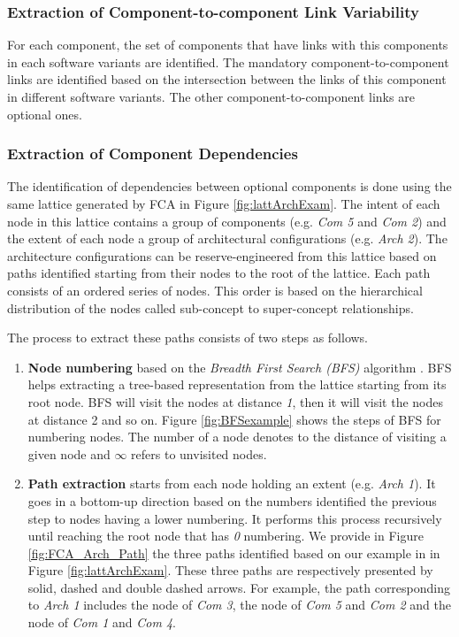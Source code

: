\documentclass[graybox]{svmult}
\begin{document}
\subsubsection{Extraction of Component-to-component Link Variability}
For each component, the set of components that have links with this components in each software variants are identified. The mandatory component-to-component links are identified based on the intersection between the links of this component in different software variants. The other component-to-component links are optional ones.


\subsubsection{Extraction of Component Dependencies}
The identification of dependencies between optional components is done using the same lattice generated by FCA in Figure \ref{fig:lattArchExam}. The intent of each node in this lattice contains a group of components (e.g. \textit{Com 5} and \textit{Com 2}) and the extent  of each node a group of architectural configurations (e.g. \textit{Arch 2}).
The architecture configurations can be reserve-engineered from this lattice based on paths identified starting from their nodes to the root of the lattice. Each path consists of an ordered series of nodes. This order is based on the hierarchical distribution of the nodes called sub-concept to super-concept relationships.

The process to extract these paths consists of two steps as follows. 

\begin{enumerate}
    \item \textbf{Node numbering} based on the \textit{Breadth First Search (BFS)} algorithm \cite{cormen2009introduction}. BFS helps extracting a tree-based representation from the lattice starting from its root node. BFS will visit the nodes at distance \textit{1}, then it will visit the nodes at distance 2 and so on. Figure \ref{fig:BFSexample} shows the steps of BFS for numbering nodes. The number of a node denotes to the distance of visiting a given node and $\infty$ refers to unvisited nodes. 
    
    \item \textbf{Path extraction} starts from each node holding an extent (e.g. \textit{Arch 1}). It goes in a bottom-up direction based on the numbers identified the previous step to nodes having a lower numbering. It performs this process recursively until reaching the root node that has \textit{0} numbering. We provide in Figure \ref{fig:FCA_Arch_Path} the three paths identified based on our example in in Figure \ref{fig:lattArchExam}. These three paths are respectively presented by solid, dashed and double dashed arrows. For example, the path corresponding to \textit{Arch 1} includes the node of \textit{Com 3}, the node of \textit{Com 5} and \textit{Com 2} and the node of \textit{Com 1} and \textit{Com 4}.
\end{enumerate}
\end{document}
